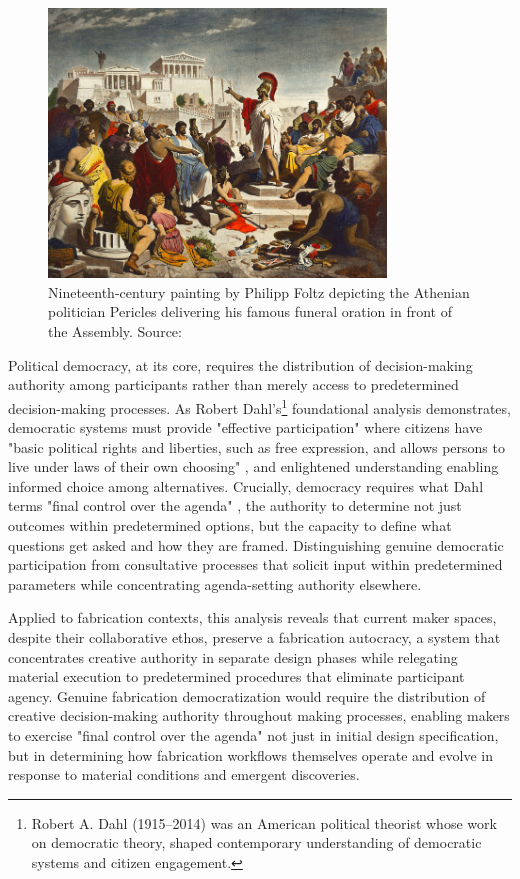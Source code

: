 \begin{figure}[H]
\centering
\includegraphics[width=0.8\textwidth]{figures/chapter2/Discurso_funebre_pericles.png}
\caption{Nineteenth-century painting by Philipp Foltz depicting the Athenian politician Pericles delivering his famous funeral oration in front of the Assembly. Source: \citet{foltz_pericles}}
\label{fig:pericles_funeral_oration}
\end{figure}

Political democracy, at its core, requires the distribution of decision-making authority among participants rather than merely access to predetermined decision-making processes. As Robert Dahl's\footnote{Robert A. Dahl (1915--2014) was an American political theorist whose work on democratic theory, shaped contemporary understanding of democratic systems and citizen engagement.} foundational analysis demonstrates, democratic systems must provide "effective participation" \citep{coglianese1990} where citizens have "basic political rights and liberties, such as free expression, and allows persons to live under laws of their own choosing" \citep{coglianese1990}, and enlightened understanding enabling informed choice among alternatives. Crucially, democracy requires what Dahl terms "final control over the agenda" \citep{mayhew2017}, the authority to determine not just outcomes within predetermined options, but the capacity to define what questions get asked and how they are framed. Distinguishing genuine democratic participation from consultative processes that solicit input within predetermined parameters while concentrating agenda-setting authority elsewhere.

\vspace{0.5cm}

Applied to fabrication contexts, this analysis reveals that current maker spaces, despite their collaborative ethos, preserve a fabrication autocracy, a system that concentrates creative authority in separate design phases while relegating material execution to predetermined procedures that eliminate participant agency. Genuine fabrication democratization would require the distribution of creative decision-making authority throughout making processes, enabling makers to exercise "final control over the agenda" not just in initial design specification, but in determining how fabrication workflows themselves operate and evolve in response to material conditions and emergent discoveries.

